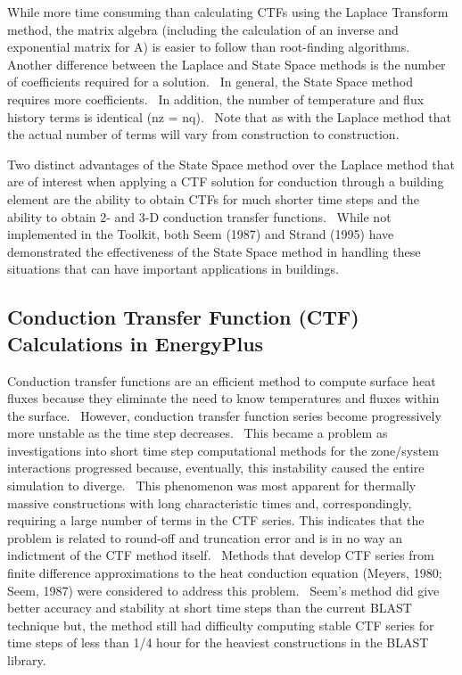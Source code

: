 While more time consuming than calculating CTFs using the Laplace Transform method, the matrix algebra (including the calculation of an inverse and exponential matrix for A) is easier to follow than root-finding algorithms.~ Another difference between the Laplace and State Space methods is the number of coefficients required for a solution.~ In general, the State Space method requires more coefficients.~ In addition, the number of temperature and flux history terms is identical (nz = nq).~ Note that as with the Laplace method that the actual number of terms will vary from construction to construction.

Two distinct advantages of the State Space method over the Laplace method that are of interest when applying a CTF solution for conduction through a building element are the ability to obtain CTFs for much shorter time steps and the ability to obtain 2- and 3-D conduction transfer functions.~ While not implemented in the Toolkit, both Seem (1987) and Strand (1995) have demonstrated the effectiveness of the State Space method in handling these situations that can have important applications in buildings.

\subsection{Conduction Transfer Function (CTF) Calculations in EnergyPlus}\label{conduction-transfer-function-ctf-calculations-in-energyplus}

Conduction transfer functions are an efficient method to compute surface heat fluxes because they eliminate the need to know temperatures and fluxes within the surface.~ However, conduction transfer function series become progressively more unstable as the time step decreases.~ This became a problem as investigations into short time step computational methods for the zone/system interactions progressed because, eventually, this instability caused the entire simulation to diverge.~ This phenomenon was most apparent for thermally massive constructions with long characteristic times and, correspondingly, requiring a large number of terms in the CTF series. This indicates that the problem is related to round-off and truncation error and is in no way an indictment of the CTF method itself.~ Methods that develop CTF series from finite difference approximations to the heat conduction equation (Meyers, 1980; Seem, 1987) were considered to address this problem.~ Seem's method did give better accuracy and stability at short time steps than the current BLAST technique but, the method still had difficulty computing stable CTF series for time steps of less than 1/4 hour for the heaviest constructions in the BLAST library.

